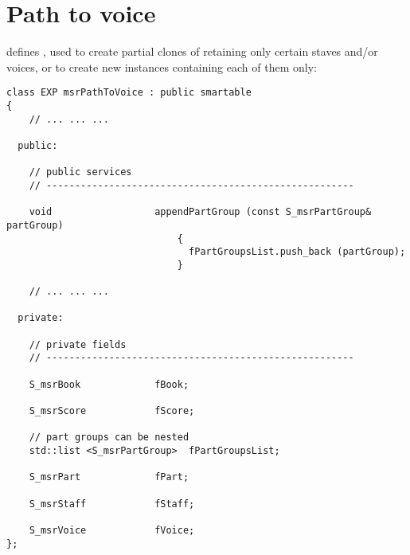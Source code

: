 



\chapter{Path to voice}\label{Path to voice}

 defines , used to create partial clones of  retaining only certain staves and/or voices, or to create new  instances containing each of them only:
\begin{lstlisting}[language=CPlusPlus]
class EXP msrPathToVoice : public smartable
{
	// ... ... ...

  public:

    // public services
    // ------------------------------------------------------

    void                  appendPartGroup (const S_msrPartGroup& partGroup)
                              {
                                fPartGroupsList.push_back (partGroup);
                              }

	// ... ... ...

  private:

    // private fields
    // ------------------------------------------------------

    S_msrBook             fBook;

    S_msrScore            fScore;

    // part groups can be nested
    std::list <S_msrPartGroup>  fPartGroupsList;

    S_msrPart             fPart;

    S_msrStaff            fStaff;

    S_msrVoice            fVoice;
};
\end{lstlisting}

